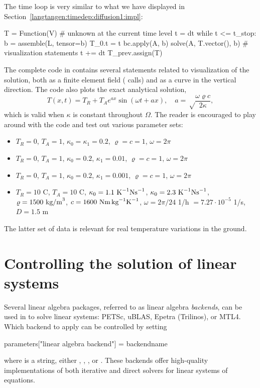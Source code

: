 The time loop is very similar to what we have displayed in
Section~\ref{langtangen:timedep:diffusion1:impl}:
\begin{python}
T = Function(V)   # unknown at the current time level
t = dt
while t <= t_stop:
    b = assemble(L, tensor=b)
    T_0.t = t
    bc.apply(A, b)
    solve(A, T.vector(), b)
    # visualization statements
    t += dt
    T_prev.assign(T)
\end{python}
The complete code in  contains several
statements related to visualization of the solution, both as a finite
element field ( calls) and as a curve in the vertical
direction. The code also plots the exact analytical solution,
\begin{equation}
T(x,t) = T_R + T_Ae^{ax}\sin (\omega t + ax),\quad a =\sqrt \frac{\omega\varrho c}{2\kappa},
\end{equation}
which is valid when $\kappa$ is constant throughout $\Omega$.  The reader
is encouraged to play around with the code and test out various parameter
sets:
\begin{itemize}
\item $T_R=0$, $T_A=1$, $\kappa_0 = \kappa_1=0.2$, $\varrho = c = 1$, $\omega = 2\pi$
\item $T_R=0$, $T_A=1$, $\kappa_0=0.2$, $\kappa_1=0.01$, $\varrho = c = 1$, $\omega = 2\pi$
\item $T_R=0$, $T_A=1$, $\kappa_0=0.2$, $\kappa_1=0.001$, $\varrho = c = 1$, $\omega = 2\pi$
\item $T_R=10$ C, $T_A=10$ C, $\kappa_0= 1.1 \hbox{ K}^{-1}\hbox{Ns}^{-1}$,
$\kappa_0= 2.3 \hbox{ K}^{-1}\hbox{Ns}^{-1}$,
$\varrho = 1500\hbox{ kg/m}^3$,
$c = 1600\hbox{ Nm\,kg}^{-1}\hbox{K}^{-1}$,
$\omega = 2\pi/24$ 1/h  $= 7.27\cdot 10^{-5}$ 1/s, $D=1.5$ m
\end{itemize}
The latter set of data is relevant for real temperature variations in
the ground.

\section{Controlling the solution of linear systems}
\label{langtangen:linsys}
\label{linear algebra backends}
\label{linear solver choice}
\label{preconditioner choice}

Several linear algebra packages, referred to as linear algebra
\emph{backends}, can be used in \fenics{} to solve linear systems:
PETSc, uBLAS, Epetra (Trilinos), or MTL4.  Which backend to apply can
be controlled by setting
\begin{python}
parameters["linear algebra backend"] = backendname
\end{python}
where  is a string, either , ,
, or .  These backends offer high-quality
implementations of both iterative and direct solvers for linear systems
of equations.

